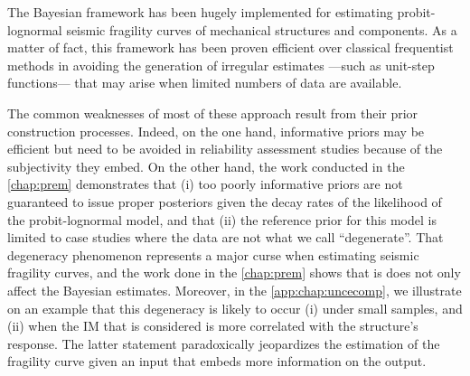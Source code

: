 

The Bayesian framework has been hugely implemented for estimating probit-lognormal seismic fragility curves of mechanical structures and components. %
As a matter of fact, this framework has been proven efficient over classical frequentist methods in avoiding the generation of irregular estimates ---such as unit-step functions--- that may arise when limited numbers of data are available.

The common 
weaknesses of most of these approach result from  %
their prior construction processes.  
Indeed, on the one hand, informative priors may be efficient but need to be 
avoided in reliability assessment studies because of the subjectivity they embed.
On the other hand, the work conducted in the \cref{chap:prem} demonstrates that (i) too poorly informative priors are not guaranteed to issue proper posteriors given the decay rates of the likelihood of the probit-lognormal model, and that (ii)  the reference prior for this model is limited to 
case studies where the data are not what we call ``degenerate''. %
That degeneracy phenomenon represents a major curse when estimating seismic fragility curves, and the work done in the \cref{chap:prem} shows that is does not only affect the Bayesian estimates.
Moreover, in the \cref{app:chap:uncecomp}, we illustrate on an example that this degeneracy is likely to occur (i) under small samples, and (ii) when the IM that is considered is more correlated with the structure's response.
The latter statement paradoxically jeopardizes the estimation of the fragility curve given an input that embeds more information on the output. %











